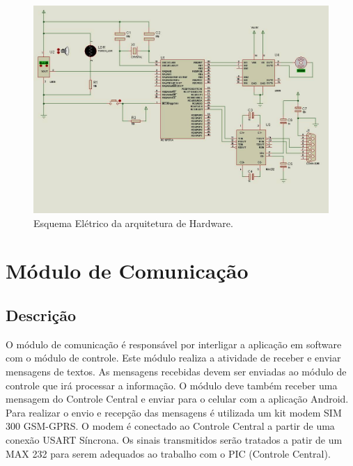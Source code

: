 \documentclass{report}
\begin{document}
      \begin{landscape}
	\begin{figure}[!h]
	    \begin{center}
	      \includegraphics[width=\linewidth]{pictures/esquema.jpg}
	      \caption{Esquema Elétrico da arquitetura de Hardware.}
	  \end{center}
	\end{figure}
      \end{landscape}
      
    \section{Módulo de Comunicação}\label{mdComunicacao}
    
      \subsection{Descrição}
      
	  O módulo de comunicação é responsável por interligar a aplicação em software com o módulo de controle. Este módulo realiza a atividade de receber e enviar mensagens de 
	  textos. As mensagens recebidas devem ser enviadas ao módulo de controle que irá processar a informação. O módulo deve também receber uma mensagem do Controle Central e enviar
	  para o celular com a aplicação Android. Para realizar o envio e recepção das mensagens é utilizada um kit modem SIM 300 GSM-GPRS. O modem é conectado ao Controle Central 
	  a partir de uma conexão USART Síncrona. Os sinais transmitidos serão tratados a patir de um MAX 232 para serem adequados ao trabalho com o PIC (Controle Central). 
	  
\end{document}
